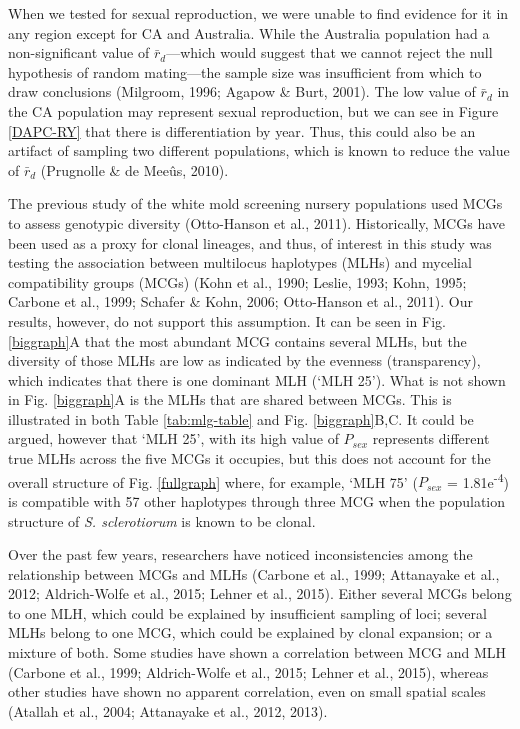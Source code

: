 \documentclass[fleqn,10pt,lineno]{wlpeerj} %
\theoremstyle{definition}
\theoremstyle{definition}
\theoremstyle{definition}
\theoremstyle{remark}
\begin{document}
When we tested for sexual reproduction, we were unable to find evidence
for it in any region except for CA and Australia. While the Australia
population had a non-significant value of \(\bar{r}_d\)---which would
suggest that we cannot reject the null hypothesis of random mating---the
sample size was insufficient from which to draw conclusions (Milgroom,
1996; Agapow \& Burt, 2001). The low value of \(\bar{r}_d\) in the CA
population may represent sexual reproduction, but we can see in Figure
\ref{DAPC-RY} that there is differentiation by year. Thus, this could
also be an artifact of sampling two different populations, which is
known to reduce the value of \(\bar{r}_d\) (Prugnolle \& de Meeûs,
2010).

The previous study of the white mold screening nursery populations used
MCGs to assess genotypic diversity (Otto-Hanson et al., 2011).
Historically, MCGs have been used as a proxy for clonal lineages, and
thus, of interest in this study was testing the association between
multilocus haplotypes (MLHs) and mycelial compatibility groups (MCGs)
(Kohn et al., 1990; Leslie, 1993; Kohn, 1995; Carbone et al., 1999;
Schafer \& Kohn, 2006; Otto-Hanson et al., 2011). Our results, however,
do not support this assumption. It can be seen in Fig. \ref{biggraph}A
that the most abundant MCG contains several MLHs, but the diversity of
those MLHs are low as indicated by the evenness (transparency), which
indicates that there is one dominant MLH (`MLH 25'). What is not shown
in Fig. \ref{biggraph}A is the MLHs that are shared between MCGs. This
is illustrated in both Table \ref{tab:mlg-table} and Fig.
\ref{biggraph}B,C. It could be argued, however that `MLH 25', with its
high value of \(P_{sex}\) represents different true MLHs across the five
MCGs it occupies, but this does not account for the overall structure of
Fig. \ref{fullgraph} where, for example, `MLH 75' (\(P_{sex}\) =
1.81e\textsuperscript{-4}) is compatible with 57 other haplotypes
through three MCG when the population structure of \emph{S.
sclerotiorum} is known to be clonal.

Over the past few years, researchers have noticed inconsistencies among
the relationship between MCGs and MLHs (Carbone et al., 1999; Attanayake
et al., 2012; Aldrich-Wolfe et al., 2015; Lehner et al., 2015). Either
several MCGs belong to one MLH, which could be explained by insufficient
sampling of loci; several MLHs belong to one MCG, which could be
explained by clonal expansion; or a mixture of both. Some studies have
shown a correlation between MCG and MLH (Carbone et al., 1999;
Aldrich-Wolfe et al., 2015; Lehner et al., 2015), whereas other studies
have shown no apparent correlation, even on small spatial scales
(Atallah et al., 2004; Attanayake et al., 2012, 2013).
\end{document}
